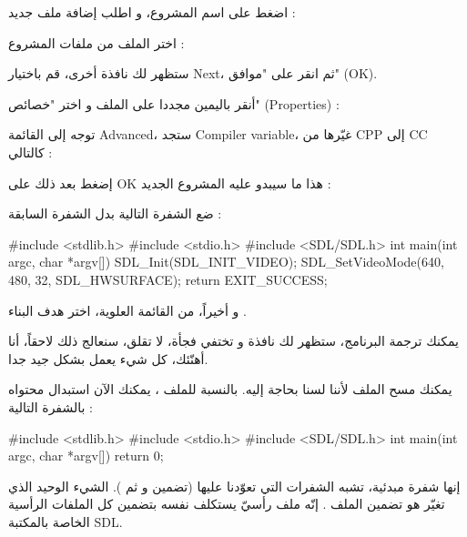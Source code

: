 
اضغط على اسم المشروع، و اطلب إضافة ملف جديد :


اختر الملف
من ملفات المشروع :


ستظهر لك نافذة أخرى، قم باختيار
\textenglish{Next}،
 ثم انقر على "موافق"
(\textenglish{OK}).


أنقر باليمين مجددا على الملف 
و اختر "خصائص" 
(\textenglish{Properties}) :


توجه إلى القائمة
\textenglish{Advanced}،
ستجد
\textenglish{Compiler variable}،
غيّرها من
\textenglish{CPP}
إلى
\textenglish{CC}
كالتالي :


إضغط بعد ذلك على
\textenglish{OK}
هذا ما سيبدو عليه المشروع الجديد :

ضع الشفرة التالية بدل الشفرة السابقة :

\begin{Csource}
#include <stdlib.h> 
#include <stdio.h> 
#include <SDL/SDL.h>
int main(int argc, char *argv[]) 
{ 
	SDL_Init(SDL_INIT_VIDEO); 
	SDL_SetVideoMode(640, 480, 32, SDL_HWSURFACE); 
	return EXIT_SUCCESS; 
}
\end{Csource}

و أخيراً، من القائمة العلوية، اختر هدف البناء 
.


يمكنك ترجمة البرنامج، ستظهر لك نافذة و تختفي فجأة، لا تقلق، سنعالج ذلك لاحقاً، أنا أهنّئك، كل شيء يعمل بشكل جيد جدا.

يمكنك مسح الملف 
لأننا لسنا بحاجة إليه. بالنسبة للملف 
، 
يمكنك الآن استبدال محتواه بالشفرة التالية :

\begin{Csource}
#include <stdlib.h>
#include <stdio.h>
#include <SDL/SDL.h>
int main(int argc, char *argv[])
{
	return 0;
}
\end{Csource}
إنها شفرة مبدئية، تشبه الشفرات التي تعوّدنا عليها (تضمين
و
ثم 
).
الشيء الوحيد الذي تغيّر هو تضمين الملف
.
إنّه ملف رأسيّ يستكلف نفسه بتضمين كل الملفات الرأسية الخاصة بالمكتبة 
\textenglish{SDL}.

